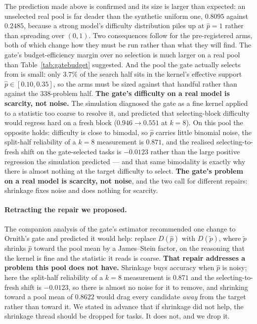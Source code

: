 The prediction made above is confirmed and its size is larger than expected: an unselected
real pool is far deader than the synthetic uniform one, $0.8095$ against $0.2485$, because a
strong model's difficulty distribution piles up at $\hat p=1$ rather than spreading over
$(0,1)$. Two consequences follow for the pre-registered arms, both of which change how they
must be run rather than what they will find. The gate's budget-efficiency margin over no
selection is much larger on a real pool than Table~\ref{tab:gatebudget} suggested. And the
pool the gate actually selects from is small: only $3.7\%$ of the search half sits in the
kernel's effective support $\hat p\in[0.10,0.35]$, so the arms must be sized against that
handful rather than against the $338$-problem half. \textbf{The gate's difficulty on a real
model is scarcity, not noise.} The simulation diagnosed the gate as a fine kernel applied to a
statistic too coarse to resolve it, and predicted that selecting-block difficulty would
regress hard on a fresh block ($0.946\to0.551$ at $k=8$). On this pool the opposite holds:
difficulty is close to bimodal, so $\hat p$ carries little binomial noise, the split-half
reliability of a $k=8$ measurement is $0.871$, and the realised selecting-to-fresh shift on
the gate-selected tasks is $-0.0123$ rather than the large positive regression the simulation
predicted --- and that same bimodality is exactly why there is
almost nothing at the target difficulty to select. \textbf{The gate's problem on a real model
is scarcity, not noise}, and the two call for different repairs: shrinkage fixes noise and
does nothing for scarcity.

\paragraph{Retracting the repair we proposed.} The companion analysis of the gate's estimator
recommended one change to Ornith's gate and predicted it would help: replace $D(\hat p)$ with
$D(\tilde p)$, where $\tilde p$ shrinks $\hat p$ toward the pool mean by a James--Stein factor,
on the reasoning that the kernel is fine and the statistic it reads is coarse. \textbf{That
repair addresses a problem this pool does not have.} Shrinkage buys accuracy when $\hat p$ is
noisy; here the split-half reliability of a $k=8$ measurement is $0.871$ and the
selecting-to-fresh shift is $-0.0123$, so there is almost no noise for it to remove, and
shrinking toward a pool mean of $0.8622$ would drag every candidate \emph{away} from the target
rather than toward it. We stated in advance that if shrinkage did not help, the shrinkage
thread should be dropped for tasks. It does not, and we drop it.

